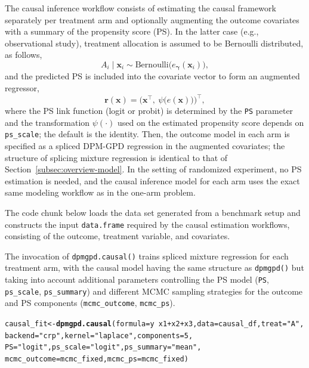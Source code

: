 \documentclass[article]{jss}\usepackage[]{graphicx}\usepackage[]{xcolor}
\makeatletter
\newcommand{\hlnum}[1]{\textcolor[rgb]{0.686,0.059,0.569}{#1}}%
\newcommand{\hlsng}[1]{\textcolor[rgb]{0.192,0.494,0.8}{#1}}%
\newcommand{\hlopt}[1]{\textcolor[rgb]{0,0,0}{#1}}%
\newcommand{\hldef}[1]{\textcolor[rgb]{0.345,0.345,0.345}{#1}}%
\newcommand{\hlkwb}[1]{\textcolor[rgb]{0.69,0.353,0.396}{#1}}%
\newcommand{\hlkwc}[1]{\textcolor[rgb]{0.333,0.667,0.333}{#1}}%
\newcommand{\hlkwd}[1]{\textcolor[rgb]{0.737,0.353,0.396}{\textbf{#1}}}%
\newenvironment{kframe}{%
 \def\at@end@of@kframe{}%
 \ifinner\ifhmode%
  \def\at@end@of@kframe{\end{minipage}}%
  \begin{minipage}{\columnwidth}%
 \fi\fi%
 \def\FrameCommand##1{\hskip\@totalleftmargin \hskip-\fboxsep
 \colorbox{shadecolor}{##1}\hskip-\fboxsep
     \hskip-\linewidth \hskip-\@totalleftmargin \hskip\columnwidth}%
 \MakeFramed {\advance\hsize-\width
   \@totalleftmargin\z@ \linewidth\hsize
   \@setminipage}}%
 {\par\unskip\endMakeFramed%
 \at@end@of@kframe}
\newenvironment{knitrout}{}{} %
\DeclareRobustCommand{\code}[1]{\nolinkurl{#1}}
\makeatother
\begin{document}
The causal inference workflow consists of estimating the causal
framework separately per treatment arm and optionally augmenting the
outcome covariates with a summary of the propensity score (PS). In the
latter case (e.g., observational study), treatment allocation is
assumed to be Bernoulli distributed, as follows,
\begin{equation*}
A_i \mid \boldsymbol{x}_i \sim \mathrm{Bernoulli}\big(e_{\boldsymbol{\gamma}}(\boldsymbol{x}_i)\big),
\end{equation*}
and the predicted PS is included into the covariate vector to form an
augmented regressor,
\begin{equation*}
\boldsymbol{r}(\boldsymbol{x}) = \big(\boldsymbol{x}^\top,\ \psi\big(\widehat e(\boldsymbol{x})\big)\big)^\top,
\end{equation*}
where the PS link function (logit or probit) is determined by the
\code{PS} parameter and the transformation $\psi(\cdot)$ used on the
estimated propensity score depends on \code{ps\_scale}; the default
is the identity. Then, the outcome model in each arm is specified as
a spliced DPM-GPD regression in the augmented covariates; the
structure of splicing mixture regression is identical to that of
Section~\ref{subsec:overview-model}. In the setting of randomized
experiment, no PS estimation is needed, and the causal inference model
for each arm uses the exact same modeling workflow as in the
one-arm problem.

The code chunk below loads the data set generated from a benchmark
setup and constructs the input \code{data.frame} required by the
causal estimation workflows, consisting of the outcome, treatment
variable, and covariates.



The invocation of \code{dpmgpd.causal()} trains spliced mixture
regression for each treatment arm, with the causal model having the
same structure as \code{dpmgpd()} but taking into account additional
parameters controlling the PS model (\code{PS}, \code{ps\_scale},
\code{ps\_summary}) and different MCMC sampling strategies for the
outcome and PS components (\code{mcmc\_outcome}, \code{mcmc\_ps}).

\begin{knitrout}\footnotesize
{}\color{fgcolor}\begin{kframe}
\begin{alltt}
\hldef{causal_fit} \hlkwb{<-} \hlkwd{dpmgpd.causal}\hldef{(}\hlkwc{formula} \hldef{= y} \hlopt{~} \hldef{x1} \hlopt{+} \hldef{x2} \hlopt{+} \hldef{x3,} \hlkwc{data} \hldef{= causal_df,} \hlkwc{treat} \hldef{=} \hlsng{"A"}\hldef{,}
                            \hlkwc{backend} \hldef{=} \hlsng{"crp"}\hldef{,} \hlkwc{kernel} \hldef{=} \hlsng{"laplace"}\hldef{,} \hlkwc{components} \hldef{=} \hlnum{5}\hldef{,}
                            \hlkwc{PS} \hldef{=} \hlsng{"logit"}\hldef{,} \hlkwc{ps_scale} \hldef{=} \hlsng{"logit"}\hldef{,} \hlkwc{ps_summary} \hldef{=} \hlsng{"mean"}\hldef{,}
                            \hlkwc{mcmc_outcome} \hldef{= mcmc_fixed,} \hlkwc{mcmc_ps} \hldef{= mcmc_fixed)}
\end{alltt}
\end{kframe}
\end{knitrout}
\end{document}

